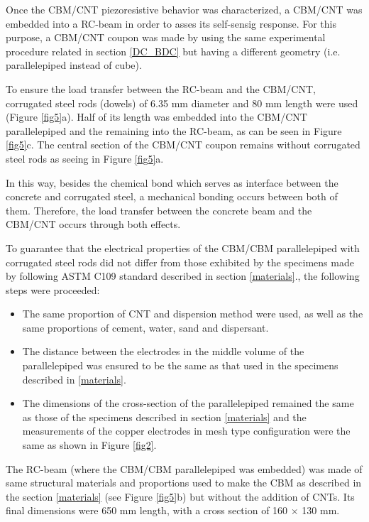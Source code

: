 \documentclass[twocolumn]{bmcart}%
\begin{document}
Once the CBM/CNT piezoresistive behavior  was characterized, a CBM/CNT was embedded into a RC-beam in order to asses its self-sensig response. For this purpose, a CBM/CNT coupon was made by using the same experimental procedure related in section \ref{DC_BDC} but having a different geometry (i.e. parallelepiped instead of cube). 

To ensure the load transfer between the RC-beam and the CBM/CNT, corrugated steel rods (dowels) of 6.35 mm diameter and 80 mm length were used (Figure \ref{fig5}a). Half of its length  was embedded into the CBM/CNT  parallelepiped and the remaining into the RC-beam, as can be seen in Figure \ref{fig5}c. The central section of the CBM/CNT coupon remains without corrugated steel rods as seeing in Figure \ref{fig5}a. 

In this way, besides the chemical bond which serves as interface between the concrete and corrugated steel, a mechanical bonding occurs between both of them. Therefore, the load transfer between the concrete beam and the CBM/CNT occurs through both effects.

To guarantee that the electrical properties of the CBM/CBM parallelepiped with corrugated steel rods did not differ from those exhibited by the specimens made by following ASTM C109 standard \cite{ASTMC1092000} described in section \ref{materials}., the following steps were proceeded:

\begin{itemize}
\item The same proportion of CNT and dispersion method were used, as well as the same proportions of cement, water, sand and dispersant.

\item The distance between the electrodes in the middle volume of the parallelepiped was ensured to be the same as that used in the specimens described in \ref{materials}.

\item The dimensions of the cross-section of the parallelepiped remained the same as those of the specimens described in section \ref{materials} and the measurements of the copper electrodes in mesh type configuration were the same as shown in Figure \ref{fig2}. 
\end{itemize}

The RC-beam (where the CBM/CBM parallelepiped was embedded) was made of same structural materials and proportions used to make the CBM as described in the section \ref{materials} (see Figure \ref{fig5}b) but without the addition of CNTs. Its final dimensions were 650 mm length, with a cross section of 160 $\times$ 130 mm.
\end{document}
